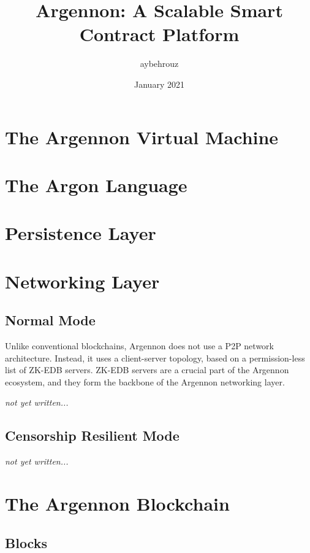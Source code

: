 \documentclass[11pt, a4paper]{report}
\title{Argennon: A Scalable Smart Contract Platform}
\author{aybehrouz}
\date{January 2021}
\newcommand{\note}[1] {
    \begin{tcolorbox}[colframe=white,colback=white]
        \emph{#1}
    \end{tcolorbox}
}
\begin{document}
    \tableofcontents


    \chapter{The Argennon Virtual Machine}\label{ch:AVM}
    


    \chapter{The Argon Language}\label{ch:argon-lang}
    



    \chapter{Persistence Layer}\label{ch:persistance}
    


    \chapter{Networking Layer}\label{ch:networking}
    \section{Normal Mode}\label{sec:normal-mode}
    Unlike conventional blockchains, Argennon does not use a P2P network architecture. Instead, it uses a
    client-server topology, based on a permission-less list of ZK-EDB servers. ZK-EDB servers are a
    crucial part of the Argennon ecosystem, and they form the backbone of the Argennon networking layer.
    \note{not yet written...}


    \section{Censorship Resilient Mode}\label{sec:cens-res-mode}
    \note{not yet written...}


    \chapter{The Argennon Blockchain}\label{ch:argennon-blockchain}
    


    \section{Blocks}\label{sec:blocks}
    
\end{document}
